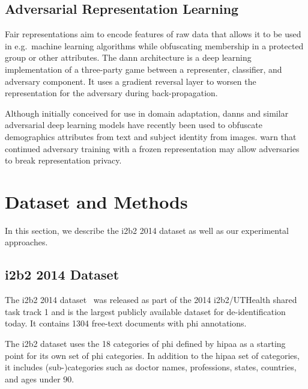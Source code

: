 \subsection{Adversarial Representation Learning}
%
Fair representations \citep{zemel2013learning,hamm2015preserving} aim to encode features of raw data that allows it to be used in e.g.\ machine learning algorithms while obfuscating membership in a protected group or other attributes.
%
The \ac{dann} architecture \citep{ganin2016domain} is a deep learning implementation of a three-party game between a representer, classifier, and adversary component.
%
It uses a gradient reversal layer to worsen the representation for the adversary during back-propagation.

%
Although initially conceived for use in domain adaptation, \acp{dann} and similar adversarial deep learning models have recently been used to obfuscate demographics attributes from text \citep{elazar2018adversarial,li2018towards} and subject identity \citep{feutry2018learning} from images.
%
\citet{elazar2018adversarial} warn that continued adversary training with a frozen representation may allow adversaries to break representation privacy.

\section{Dataset and Methods}
%
In this section, we describe the i2b2 2014 dataset as well as our experimental approaches.

\subsection{i2b2 2014 Dataset}
%
The i2b2 2014 dataset~\citep{stubbs2015annotating} was released as part of the 2014 i2b2/UTHealth shared task track 1 and is the largest publicly available dataset for de-identification today.
%
It contains 1304 free-text documents with \ac{phi} annotations.
%

%
The i2b2 dataset uses the 18 categories of \ac{phi} defined by \ac{hipaa} as a starting point for its own set of \ac{phi} categories.
%
In addition to the \ac{hipaa} set of categories, it includes (sub-)categories such as doctor names, professions, states, countries, and ages under 90.

